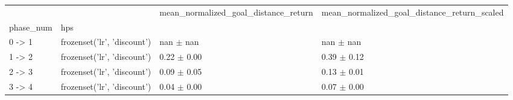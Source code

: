 \begin{tabular}{llll}
\toprule
 &  & mean_normalized_goal_distance_return & mean_normalized_goal_distance_return_scaled \\
phase_num & hps &  &  \\
\midrule
0 -> 1 & frozenset({'lr', 'discount'}) & nan $\pm$ nan & nan $\pm$ nan \\
\cline{1-4}
1 -> 2 & frozenset({'lr', 'discount'}) & 0.22 $\pm$ 0.00 & 0.39 $\pm$ 0.12 \\
\cline{1-4}
2 -> 3 & frozenset({'lr', 'discount'}) & 0.09 $\pm$ 0.05 & 0.13 $\pm$ 0.01 \\
\cline{1-4}
3 -> 4 & frozenset({'lr', 'discount'}) & 0.04 $\pm$ 0.00 & 0.07 $\pm$ 0.00 \\
\cline{1-4}
\bottomrule
\end{tabular}
